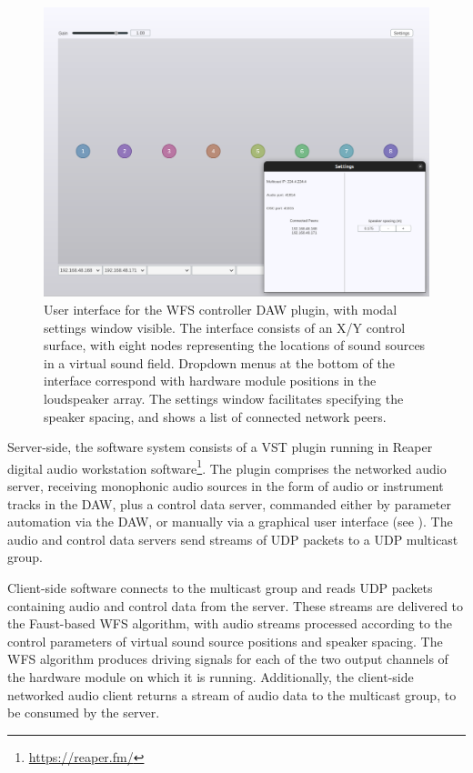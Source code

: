 \begin{figure}[ht]
    \centering
    \includegraphics[width=\textwidth]{figures/plugin}
    \caption{
        User interface for the WFS controller DAW plugin, with modal
        settings window visible.
        The interface consists of an X/Y control surface, with eight nodes
        representing the locations of sound sources in a virtual sound field.
        Dropdown menus at the bottom of the interface correspond with hardware
        module positions in the loudspeaker array.
        The settings window facilitates specifying the speaker spacing, and
        shows a list of connected network peers.
    }
    \label{fig:plugin-interface}
\end{figure}

Server-side, the software system consists of a VST plugin running in Reaper
digital audio workstation software\footnote{\url{https://reaper.fm/}}.
The plugin comprises the networked audio server, receiving monophonic audio
sources in the form of audio or instrument tracks in the DAW, plus a control
data server, commanded either by parameter automation via the DAW, or manually
via a graphical user interface (see ).
The audio and control data servers send streams of UDP packets to a UDP
multicast group.

Client-side software connects to the multicast group and reads UDP packets
containing audio and control data from the server.
These streams are delivered to the Faust-based WFS algorithm, with audio
streams processed according to the control parameters of virtual sound source
positions and speaker spacing.
The WFS algorithm produces driving signals for each of the two output channels
of the hardware module on which it is running.
Additionally, the client-side networked audio client returns a stream of audio
data to the multicast group, to be consumed by the server.

